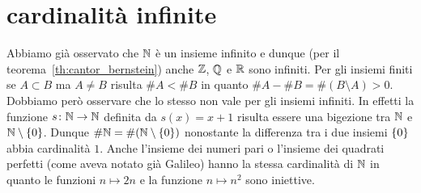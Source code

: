 
\section{cardinalità infinite}

Abbiamo già osservato che ${\mathbb N}$ è un insieme infinito e dunque (per il teorema~\ref{th:cantor_bernstein})
anche ${\mathbb Z}$, ${\mathbb Q}$ e ${\mathbb R}$ sono infiniti.
Per gli insiemi finiti se $A\subset B$ ma $A\neq B$ risulta $\#A < \# B$
in quanto $\#A - \#B = \#(B\setminus A) > 0$. 
Dobbiamo però osservare che lo stesso non vale per gli insiemi infiniti.
In effetti la funzione $s\colon {\mathbb N} \to {\mathbb N}$ definita da $s(x)=x+1$
risulta essere una bigezione tra ${\mathbb N}$ e ${\mathbb N}\setminus{\left\{ 0 \right\}}$. 
Dunque $\#{\mathbb N} = \#({\mathbb N}\setminus{\left\{ 0 \right\}})$ 
nonostante la differenza tra i due insiemi ${\left\{ 0 \right\}}$ abbia 
cardinalità $1$. 
Anche l'insieme dei numeri pari o l'insieme 
dei quadrati perfetti (come aveva notato già Galileo)
hanno la stessa cardinalità di ${\mathbb N}$ in quanto le funzioni $n\mapsto 2n$
e la funzione $n\mapsto n^2$ sono iniettive.

